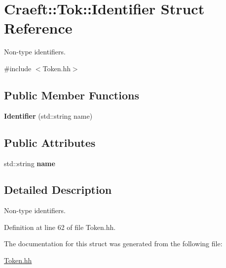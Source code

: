 \hypertarget{struct_craeft_1_1_tok_1_1_identifier}{}\section{Craeft\+:\+:Tok\+:\+:Identifier Struct Reference}
\label{struct_craeft_1_1_tok_1_1_identifier}


Non-\/type identifiers.  




{\ttfamily \#include $<$Token.\+hh$>$}

\subsection*{Public Member Functions}
\begin{DoxyCompactItemize}
\item 
\hypertarget{struct_craeft_1_1_tok_1_1_identifier_acdc709d34c4a75c47d25292d14b92db6}{}\label{struct_craeft_1_1_tok_1_1_identifier_acdc709d34c4a75c47d25292d14b92db6} 
{\bfseries Identifier} (std\+::string name)
\end{DoxyCompactItemize}
\subsection*{Public Attributes}
\begin{DoxyCompactItemize}
\item 
\hypertarget{struct_craeft_1_1_tok_1_1_identifier_a6ff35ba5863ea7e8b0510a47cee73594}{}\label{struct_craeft_1_1_tok_1_1_identifier_a6ff35ba5863ea7e8b0510a47cee73594} 
std\+::string {\bfseries name}
\end{DoxyCompactItemize}


\subsection{Detailed Description}
Non-\/type identifiers. 

Definition at line 62 of file Token.\+hh.



The documentation for this struct was generated from the following file\+:\begin{DoxyCompactItemize}
\item 
\hyperlink{_token_8hh}{Token.\+hh}\end{DoxyCompactItemize}

